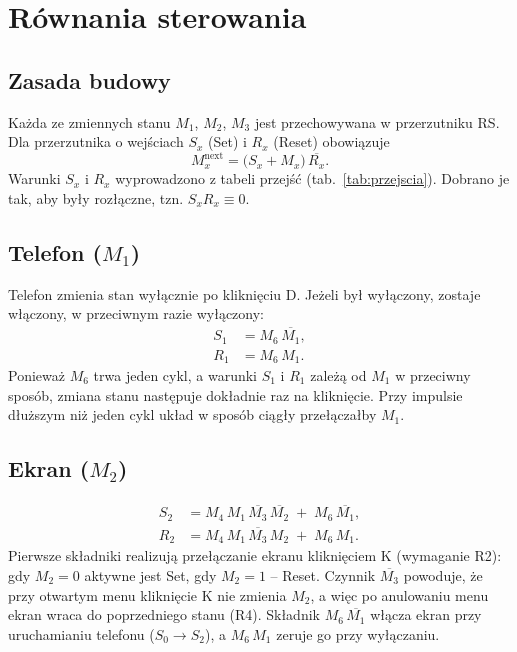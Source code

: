 \section{Równania sterowania}
\label{sec:rownania}

\subsection{Zasada budowy}
Każda ze zmiennych stanu $M_1$, $M_2$, $M_3$ jest przechowywana
w przerzutniku RS. Dla przerzutnika o wejściach $S_x$ (Set) i $R_x$
(Reset) obowiązuje
\begin{equation}
    M_x^{\text{next}} = \bigl(S_x + M_x\bigr)\,\overline{R_x}.
    \label{eq:rs}
\end{equation}
Warunki $S_x$ i $R_x$ wyprowadzono z tabeli przejść
(tab.~\ref{tab:przejscia}). Dobrano je tak, aby były rozłączne, tzn.
$S_x R_x \equiv 0$.

\subsection{Telefon ($M_1$)}
Telefon zmienia stan wyłącznie po kliknięciu D. Jeżeli był wyłączony,
zostaje włączony, w przeciwnym razie wyłączony:
\begin{align}
    S_1 &= M_6\,\overline{M_1}, \label{eq:s1}\\
    R_1 &= M_6\,M_1. \label{eq:r1}
\end{align}
Ponieważ $M_6$ trwa jeden cykl, a warunki $S_1$ i $R_1$ zależą od
$M_1$ w przeciwny sposób, zmiana stanu następuje dokładnie raz na
kliknięcie. Przy impulsie dłuższym niż jeden cykl układ w sposób
ciągły przełączałby $M_1$.

\subsection{Ekran ($M_2$)}
\begin{align}
    S_2 &= M_4\,M_1\,\overline{M_3}\,\overline{M_2} \;+\; M_6\,\overline{M_1}, \label{eq:s2}\\
    R_2 &= M_4\,M_1\,\overline{M_3}\,M_2 \;+\; M_6\,M_1. \label{eq:r2}
\end{align}
Pierwsze składniki realizują przełączanie ekranu kliknięciem K
(wymaganie R2): gdy $M_2=0$ aktywne jest Set, gdy $M_2=1$ -- Reset.
Czynnik $\overline{M_3}$ powoduje, że przy otwartym menu kliknięcie K
nie zmienia $M_2$, a więc po anulowaniu menu ekran wraca do
poprzedniego stanu (R4). Składnik $M_6\,\overline{M_1}$ włącza ekran
przy uruchamianiu telefonu ($S_0 \to S_2$), a $M_6\,M_1$ zeruje go
przy wyłączaniu.

